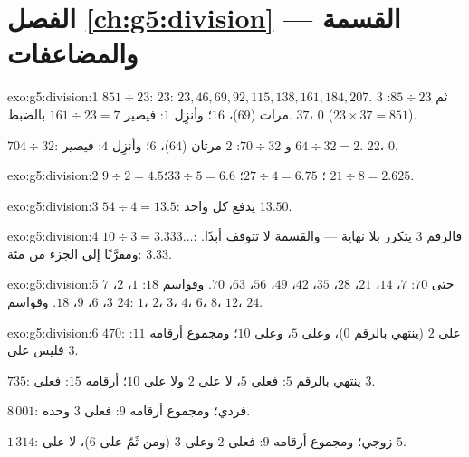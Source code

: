 \section*{الفصل \ref{ch:g5:division} --- القسمة والمضاعفات}

\begin{solution}{exo:g5:division:1}
$851 \div 23$:  $23$: $23, 46, 69, 92, 115, 138, 161,
184, 207$. ثم $85 \div 23$: $3$ مرات ($69$)،  $16$؛
وأنزِل $1$: فيصير $161 \div 23 = 7$ بالضبط.  $37$،
 $0$ ($23 \times 37 = 851$).

$704 \div 32$: و $70 \div 32$: $2$ مرتان ($64$)،  $6$؛ وأنزِل
$4$: فيصير $64 \div 32 = 2$.  $22$،  $0$.
\end{solution}

\begin{solution}{exo:g5:division:2}
$9 \div 2 = 4.5$؛ \quad $27 \div 4 = 6.75$؛ \quad
$33 \div 5 = 6.6$؛ \quad $21 \div 8 = 2.625$.
\end{solution}

\begin{solution}{exo:g5:division:3}
$54 \div 4 = 13.5$: يدفع كل واحد $13.50$.
\end{solution}

\begin{solution}{exo:g5:division:4}
$10 \div 3 = 3.333\dots$: فالرقم $3$ يتكرر بلا نهاية ---
والقسمة لا تتوقف أبدًا. ومقرَّبًا إلى الجزء من مئة: $3.33$.
\end{solution}

\begin{solution}{exo:g5:division:5}
 $7$ حتى $70$: $7$، $14$، $21$، $28$، $35$، $42$، $49$،
$56$، $63$، $70$. وقواسم $18$: $1$، $2$، $3$، $6$، $9$، $18$.
وقواسم $24$: $1$، $2$، $3$، $4$، $6$، $8$، $12$، $24$.
\end{solution}

\begin{solution}{exo:g5:division:6}
$470$: على $2$ (ينتهي بالرقم $0$)، وعلى $5$، وعلى $10$؛ ومجموع أرقامه $11$:
فليس على $3$.

$735$: ينتهي بالرقم $5$: فعلى $5$، لا على $2$ ولا على $10$؛ 
أرقامه $15$: فعلى $3$.

$8\,001$: فردي؛ ومجموع أرقامه $9$: فعلى $3$ وحده.

$1\,314$: زوجي؛ ومجموع أرقامه $9$: فعلى $2$ وعلى $3$ (ومن ثَمّ على $6$)،
لا على $5$.
\end{solution}

